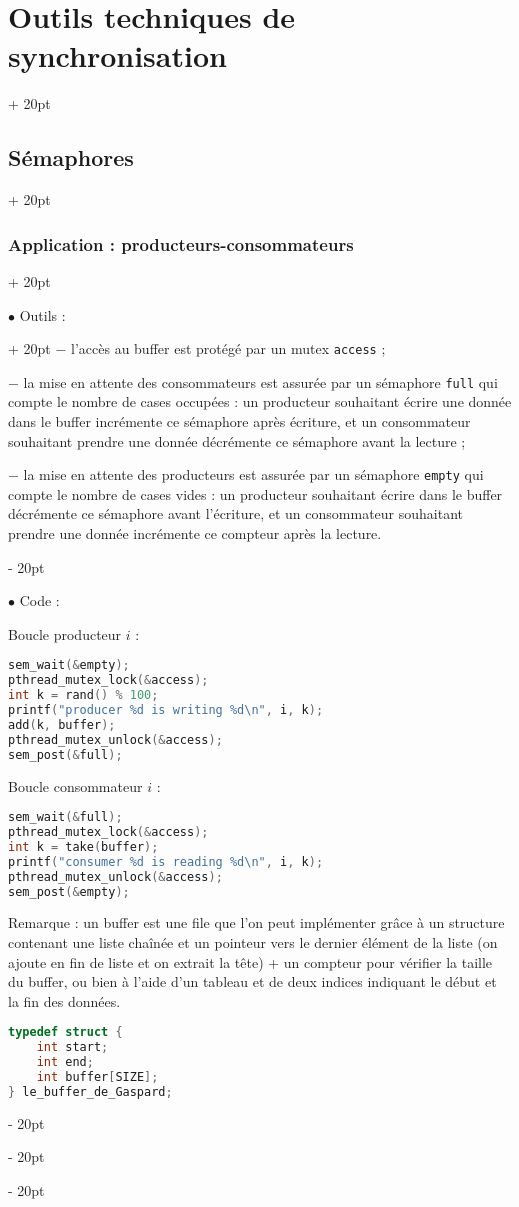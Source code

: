 \documentclass[a4paper, 12pt, twoside]{article}
\newcommand{\ind}[1][20pt]{\advance\leftskip + #1}
\newcommand{\deind}[1][20pt]{\advance\leftskip - #1}
\newenvironment{indt}[2][20pt]{#2 \par \ind[#1]}{\par \deind} %
\begin{document}
\begin{indt}{\section{Outils techniques de synchronisation}}
\begin{indt}{\subsection{Sémaphores}}
\begin{indt}{\subsubsection{Application : producteurs-consommateurs}}
                \vspace{6pt}
                
                \begin{indt}{$\bullet$ Outils :}
                    $-$ l'accès au buffer est protégé par un mutex \texttt{access} ;

                    $-$ la mise en attente des consommateurs est assurée par un sémaphore \texttt{full} qui compte le nombre de cases occupées : un producteur souhaitant écrire une donnée dans le buffer incrémente ce sémaphore après écriture, et un consommateur souhaitant prendre une donnée décrémente ce sémaphore avant la lecture ;

                    $-$ la mise en attente des producteurs est assurée par un sémaphore \texttt{empty} qui compte le nombre de cases vides : un producteur souhaitant écrire dans le buffer décrémente ce sémaphore avant l'écriture, et un consommateur souhaitant prendre une donnée incrémente ce compteur après la lecture.
                \end{indt}

                \vspace{6pt}
                
                $\bullet$ Code :

                Boucle producteur $i$ :
                \begin{lstlisting}[language=C, xleftmargin=80pt]
sem_wait(&empty);
pthread_mutex_lock(&access);
int k = rand() % 100;
printf("producer %d is writing %d\n", i, k);
add(k, buffer);
pthread_mutex_unlock(&access);
sem_post(&full);\end{lstlisting}

                Boucle consommateur $i$ :
                \begin{lstlisting}[language=C, xleftmargin=80pt]
sem_wait(&full);
pthread_mutex_lock(&access);
int k = take(buffer);
printf("consumer %d is reading %d\n", i, k);
pthread_mutex_unlock(&access);
sem_post(&empty);\end{lstlisting}

                Remarque : un buffer est une file que l'on peut implémenter grâce à un structure contenant une liste chaînée et un pointeur vers le dernier élément de la liste (on ajoute en fin de liste et on extrait la tête) + un compteur pour vérifier la taille du buffer, ou bien à l'aide d'un tableau et de deux indices indiquant le début et la fin des données.

                \begin{lstlisting}[language=C, xleftmargin=80pt]
typedef struct {
    int start;
    int end;
    int buffer[SIZE];
} le_buffer_de_Gaspard;\end{lstlisting}


\end{indt}
\end{indt}
\end{indt}
\end{document}
